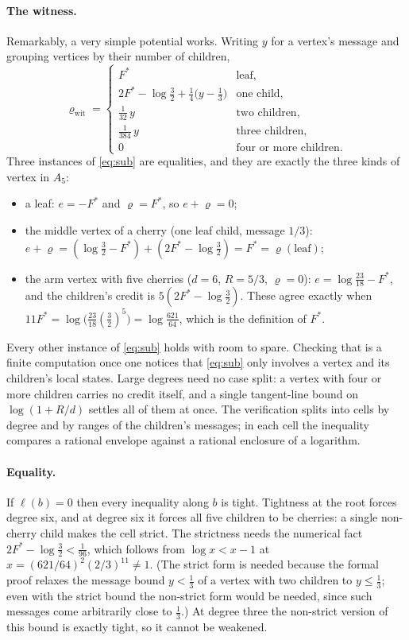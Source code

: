 \documentclass[11pt]{article}
\theoremstyle{definition}
\newcommand{\bell}{\ell}
\newcommand{\Fs}{F^{\ast}}
\begin{document}
\paragraph{The witness.} Remarkably, a very simple potential works. Writing $y$ for a vertex's message
and grouping vertices by their number of children,
\[
  \varrho_{\mathrm{wit}}=
  \begin{cases}
    \Fs & \text{leaf},\\[1pt]
    2\Fs-\log\tfrac32+\tfrac14\big(y-\tfrac13\big) & \text{one child},\\[1pt]
    \tfrac1{32}\,y & \text{two children},\\[1pt]
    \tfrac1{384}\,y & \text{three children},\\[1pt]
    0 & \text{four or more children}.
  \end{cases}
\]
Three instances of \eqref{eq:sub} are equalities, and they are exactly the three kinds of vertex in
$A_5$:
\begin{itemize}
\item a leaf: $e=-\Fs$ and $\varrho=\Fs$, so $e+\varrho=0$;
\item the middle vertex of a cherry (one leaf child, message $1/3$):
  $e+\varrho=(\log\tfrac32-\Fs)+(2\Fs-\log\tfrac32)=\Fs=\varrho(\text{leaf})$;
\item the arm vertex with five cherries ($d=6$, $R=5/3$, $\varrho=0$):
  $e=\log\tfrac{23}{18}-\Fs$, and the children's credit is $5(2\Fs-\log\tfrac32)$. These agree exactly
  when $11\Fs=\log\big(\tfrac{23}{18}(\tfrac32)^5\big)=\log\tfrac{621}{64}$, which is the definition of
  $\Fs$.
\end{itemize}
Every other instance of \eqref{eq:sub} holds with room to spare. Checking that is a finite computation
once one notices that \eqref{eq:sub} only involves a vertex and its children's local states. Large
degrees need no case split: a vertex with four or more children carries no credit itself, and a single
tangent-line bound on $\log(1+R/d)$ settles all of them at once. The verification splits into cells by degree and by ranges of the children's messages;
in each cell the inequality compares a rational envelope against a rational enclosure of a logarithm.

\paragraph{Equality.} If $\bell(b)=0$ then every inequality along $b$ is tight. Tightness at the root
forces degree six, and at degree six it forces all five children to be cherries: a single non-cherry
child makes the cell strict. The strictness needs the numerical fact $2\Fs-\log\tfrac32<\tfrac1{96}$,
which follows from $\log x<x-1$ at $x=(621/64)^2(2/3)^{11}\neq1$. (The strict form is needed because the
formal proof relaxes the message bound $y<\frac13$ of a vertex with two children to $y\le\frac13$; even
with the strict bound the non-strict form would be needed, since such messages come arbitrarily close to
$\frac13$.) At degree three the non-strict
version of this bound is exactly tight, so it cannot be weakened.
\end{document}
